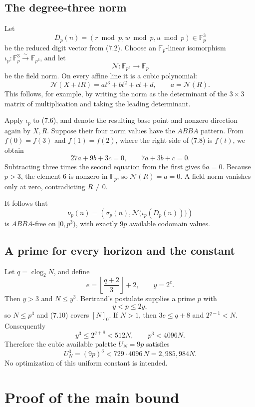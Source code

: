 \documentclass[11pt]{article}
\theoremstyle{definition}
\newcommand{\F}{\mathbb F}
\newcommand{\clog}{\operatorname{clog}_2}
\begin{document}
\subsection{The degree-three norm}

Let
\[
 \overline D_p(n)=(r\bmod p,w\bmod p,u\bmod p)\in\F_p^3
\]
be the reduced digit vector from (7.2).  Choose an \(\F_p\)-linear
isomorphism
\(\iota_p:\F_p^3\xrightarrow{\sim}\F_{p^3}\), and let
\[
 \mathcal N:\F_{p^3}\longrightarrow\F_p
 \tag{7.7}
\]
be the field norm.  On every affine line it is a cubic polynomial:
\[
 \mathcal N(X+tR)=at^3+bt^2+ct+d,\qquad a=\mathcal N(R).
 \tag{7.8}
\]
This follows, for example, by writing the norm as the determinant of the
\(3\times3\) matrix of multiplication and taking the leading determinant.

Apply \(\iota_p\) to (7.6), and denote the resulting base point and nonzero
direction again by \(X,R\).  Suppose their four norm values have the
\(ABBA\) pattern.  From \(f(0)=f(3)\) and \(f(1)=f(2)\), where the right
side of (7.8) is \(f(t)\),
we obtain
\[
 27a+9b+3c=0,\qquad7a+3b+c=0.
 \tag{7.9}
\]
Subtracting three times the second equation from the first gives \(6a=0\).
Because \(p>3\), the element \(6\) is nonzero in \(\F_p\), so
\(\mathcal N(R)=a=0\).  A field norm vanishes only at zero, contradicting
\(R\ne0\).

It follows that
\[
 \nu_p(n)=
 \left(\sigma_p(n),
 \mathcal N\bigl(\iota_p(\overline D_p(n))\bigr)\right)
 \tag{7.10}
\]
is \(ABBA\)-free on \([0,p^3)\), with exactly \(9p\) available codomain
values.

\subsection{A prime for every horizon and the constant}

Let \(q=\clog N\), and define
\[
 e=\left\lfloor\frac{q+2}{3}\right\rfloor+2,\qquad y=2^e.
 \tag{7.11}
\]
Then \(y>3\) and \(N\leq y^3\).  Bertrand's postulate supplies a prime
\(p\) with
\[
 y<p\leq2y,
 \tag{7.12}
\]
so \(N\leq p^3\) and (7.10) covers \([N]_0\).  If \(N>1\), then
\(3e\leq q+8\) and \(2^{q-1}<N\).  Consequently
\[
 y^3\leq2^{q+8}<512N,\qquad p^3<4096N.
 \tag{7.13}
\]
Therefore the cubic available palette \(U_N=9p\) satisfies
\[
 U_N^3=(9p)^3<729\cdot4096\,N
 =2{,}985{,}984N.
 \tag{7.14}
\]
No optimization of this uniform constant is intended.

\section{Proof of the main bound}
\end{document}
